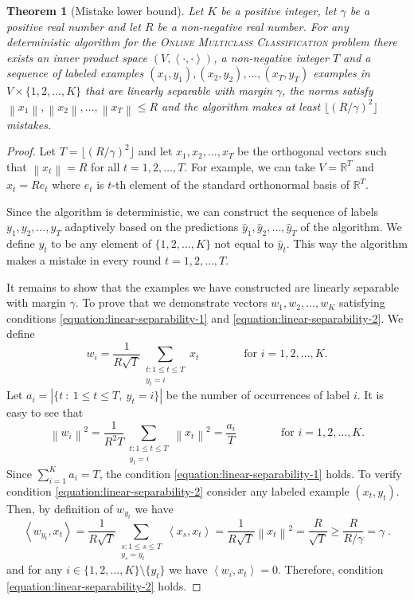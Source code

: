 \documentclass[12pt]{article}
\newtheorem{theorem}[definition]{Theorem}
\newcommand{\R}{\mathbb{R}}  %
\newcommand{\ip}[2]{\left\langle #1, #2 \right\rangle} %
\newcommand{\norm}[1]{\left\| #1 \right\|}  %
\begin{document}
\begin{theorem}[Mistake lower bound]
\label{theorem:online-multiclass-classification-mistake-lower-bound}
Let $K$ be a positive integer, let $\gamma$ be a positive real number and let
$R$ be a non-negative real number. For any deterministic algorithm for the
\textsc{Online Multiclass Classification} problem there exists an
inner product space $(V, \ip{\cdot}{\cdot})$, a non-negative integer $T$ and a
sequence of labeled examples $(x_1, y_1), (x_2, y_2), \dots, (x_T, y_T)$
examples in $V \times \{1,2,\dots,K\}$ that are linearly separable with margin
$\gamma$, the norms satisfy $\norm{x_1}, \norm{x_2}, \dots, \norm{x_T} \le R$
and the algorithm makes at least $\lfloor (R/\gamma)^2 \rfloor$ mistakes.
\end{theorem}

\begin{proof}
Let $T = \lfloor (R/\gamma)^2 \rfloor$ and let $x_1, x_2, \dots, x_T$ be the
orthogonal vectors such that $\norm{x_t} = R$ for all $t=1,2,\dots,T$. For
example, we can take $V = \R^T$ and $x_t = R e_t$ where $e_t$ is $t$-th element
of the standard orthonormal basis of $\R^T$.

Since the algorithm is deterministic, we can construct the sequence of labels
$y_1, y_2, \dots, y_T$ adaptively based on the predictions $\widehat y_1,
\widehat y_2, \dots, \widehat y_T$ of the algorithm. We define $y_t$ to be any
element of $\{1,2,\dots,K\}$ not equal to $\widehat y_t$. This way the algorithm
makes a mistake in every round $t=1,2,\dots,T$.

It remains to show that the examples we have constructed are linearly separable
with margin $\gamma$. To prove that we demonstrate vectors $w_1, w_2, \dots, w_K$
satisfying conditions \eqref{equation:linear-separability-1} and
\eqref{equation:linear-separability-2}. We define
$$
w_i = \frac{1}{R\sqrt{T}} \sum_{\substack{t : 1 \le t \le T \\ y_t = i}} x_t \qquad \qquad \text{for $i=1,2,\dots,K$.}
$$
Let $a_i = |\{ t ~:~ 1 \le t \le T, \ y_t = i \}|$ be the number of occurrences of label $i$.
It is easy to see that
$$
\norm{w_i}^2 = \frac{1}{R^2 T} \sum_{\substack{t : 1 \le t \le T \\ y_t = i}} \norm{x_t}^2 = \frac{a_i}{T} \qquad \qquad \text{for $i=1,2,\dots,K$.}
$$
Since $\sum_{i=1}^K a_i = T$, the condition
\eqref{equation:linear-separability-1} holds. To verify condition
\eqref{equation:linear-separability-2} consider any labeled example $(x_t,
y_t)$. Then, by definition of $w_{y_t}$ we have
$$
\ip{w_{y_t}}{x_t}
= \frac{1}{R\sqrt{T}} \sum_{\substack{s : 1 \le s \le T \\ y_s = y_t}} \ip{x_s}{x_t}
= \frac{1}{R\sqrt{T}} \norm{x_t}^2
= \frac{R}{\sqrt{T}}
\ge \frac{R}{R/\gamma}
= \gamma \; .
$$
and for any $i \in \{1,2,\dots,K\} \setminus \{y_t\}$ we have
$\ip{w_i}{x_t} = 0$. Therefore, condition \eqref{equation:linear-separability-2} holds.
\end{proof}
\end{document}
